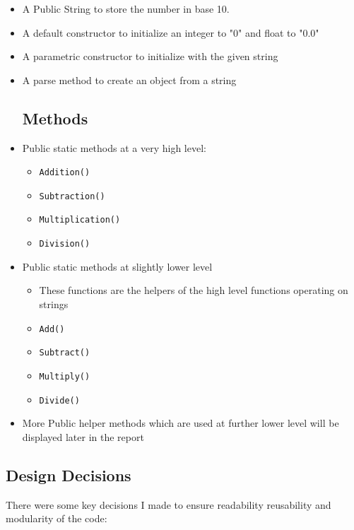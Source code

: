 \documentclass{article}
\begin{document}
\begin{itemize}
    \item A Public String to store the number in base 10.

    \item A default constructor to initialize an integer  to "0" and float to "0.0"
    
    \item A parametric constructor to initialize with the given string

    \item A parse method to create an object from a string
\subsection{Methods}
    \item Public static methods at a very high level:
    \begin{itemize}
        \item \texttt{Addition()}
        \item \texttt{Subtraction()}
        \item \texttt{Multiplication()}
        \item \texttt{Division()}
    \end{itemize}
    \item Public static methods at slightly lower level
    \begin{itemize}
    \item These functions are the helpers of the high level functions operating on strings
        \item \texttt{Add()}
        \item \texttt{Subtract()}
        \item \texttt{Multiply()}
        \item \texttt{Divide()}
    \end{itemize}
    \item More Public helper methods which are used at further lower level will be displayed later in the report

\end{itemize}

\subsection{Design Decisions}

There were some key decisions I made to ensure readability reusability and modularity of the code:
\end{document}
